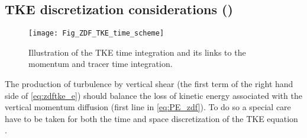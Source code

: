 \documentclass[../tex_main/NEMO_manual]{subfiles}
\begin{document}
\subsection{TKE discretization considerations (\protect{})}
\label{subsec:ZDF_tke_ene}

\begin{figure}[!t]   \begin{center}
\texttt{[image: Fig\_ZDF\_TKE\_time\_scheme]}
\caption{ \protect\label{fig:TKE_time_scheme} 
Illustration of the TKE time integration and its links to the momentum and tracer time integration. }
\end{center}  
\end{figure}

The production of turbulence by vertical shear (the first term of the right hand side 
of \autoref{eq:zdftke_e}) should balance the loss of kinetic energy associated with
the vertical momentum diffusion (first line in \autoref{eq:PE_zdf}). To do so a special care 
have to be taken for both the time and space discretization of the TKE equation 
\citep{Burchard_OM02,Marsaleix_al_OM08}.
\end{document}
